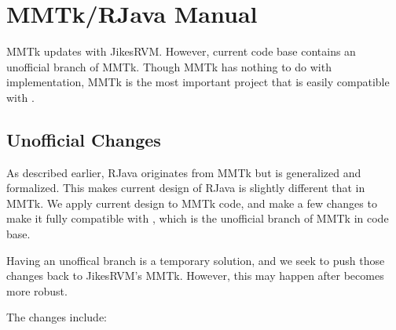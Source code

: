 \documentclass[12pt]{article}
\begin{document}
\clearpage

\section{MMTk/RJava Manual}

MMTk updates with JikesRVM. However, current \rjc code base contains an unofficial 
branch of MMTk. Though MMTk has nothing to do with \rjc implementation,
MMTk is the most important project that is easily compatible with \rjc. 

\subsection{Unofficial Changes}

As described earlier, RJava originates from MMTk but is generalized and formalized. 
This makes current design of RJava is slightly different that in MMTk. 
We apply current design to MMTk code, and make a few changes to make it
fully compatible with \rjc, which is the unofficial branch of MMTk in \rjc code base. 

Having an unoffical branch is a temporary solution, and we seek to push those
changes back to JikesRVM's MMTk. However, this may happen after \rjc becomes 
more robust. 

The changes include:
\end{document}
